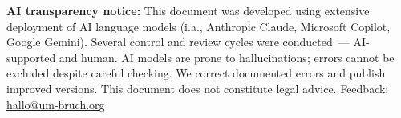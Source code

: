 \documentclass{umbruch-position}
\begin{document}
\vspace{2mm}
\noindent\textbf{AI transparency notice:} This document was developed using extensive deployment of AI language models (i.a., Anthropic Claude, Microsoft Copilot, Google Gemini). Several control and review cycles were conducted~--- AI-supported and human. AI models are prone to hallucinations; errors cannot be excluded despite careful checking. We correct documented errors and publish improved versions. This document does not constitute legal advice. Feedback: \href{mailto:hallo@um-bruch.org}{hallo@um-bruch.org}
\end{document}
